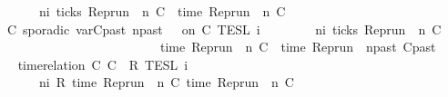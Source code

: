 \begin{isabellebody}
\ \ \ \ \ \ {\isacharbraceleft}{\isasymrho}{\isachardot}\ {\isasymexists}n{\isasymge}i{\isachardot}\ ticks\ {\isacharparenleft}{\isacharparenleft}Rep{\isacharunderscore}run\ {\isasymrho}{\isacharparenright}\ n\ C\ {\isasymand}\ time\ {\isacharparenleft}{\isacharparenleft}Rep{\isacharunderscore}run\ {\isasymrho}{\isacharparenright}\ n\ C\ {\isacharequal}\ {\isasymtau}{\isacharbraceright}{\isacartoucheclose}\isanewline
{\isacharbar}\ {\isacartoucheopen}{\isasymlbrakk}\ C\ sporadic{\isasymsharp}\ {\isasymlparr}{\isasymtau}\isactrlsub v\isactrlsub a\isactrlsub r{\isacharparenleft}C\isactrlsub p\isactrlsub a\isactrlsub s\isactrlsub t{\isacharcomma}\ n\isactrlsub p\isactrlsub a\isactrlsub s\isactrlsub t{\isacharparenright}\ {\isasymoplus}\ {\isasymdelta}{\isasymtau}{\isasymrparr}\ on\ C\ {\isasymrbrakk}\isactrlsub T\isactrlsub E\isactrlsub S\isactrlsub L\isactrlbsup {\isasymge}\ i\isactrlesup \ {\isacharequal}\isanewline
\ \ \ \ \ \ {\isacharbraceleft}{\isasymrho}{\isachardot}\ {\isasymexists}n{\isasymge}i{\isachardot}\ ticks\ {\isacharparenleft}{\isacharparenleft}Rep{\isacharunderscore}run\ {\isasymrho}{\isacharparenright}\ n\ C\isanewline
\ \ \ \ \ \ \ \ \ \ \ \ \ \ \ \ \ \ \ \ \ \ \ \ \ {\isasymand}\ time\ {\isacharparenleft}{\isacharparenleft}Rep{\isacharunderscore}run\ {\isasymrho}{\isacharparenright}\ n\ C\ {\isacharequal}\ time\ {\isacharparenleft}{\isacharparenleft}Rep{\isacharunderscore}run\ {\isasymrho}{\isacharparenright}\ n\isactrlsub p\isactrlsub a\isactrlsub s\isactrlsub t\ C\isactrlsub p\isactrlsub a\isactrlsub s\isactrlsub t{\isacharparenright}\ {\isacharplus}\ {\isasymdelta}{\isasymtau}\ {\isacharbraceright}{\isacartoucheclose}\isanewline
{\isacharbar}\ {\isacartoucheopen}{\isasymlbrakk}\ time{\isacharminus}relation\ {\isasymlfloor}C\ C\ {\isasymin}\ R\ {\isasymrbrakk}\isactrlsub T\isactrlsub E\isactrlsub S\isactrlsub L\isactrlbsup {\isasymge}\ i\isactrlesup \ {\isacharequal}\isanewline
\ \ \ \ \ \ {\isacharbraceleft}{\isasymrho}{\isachardot}\ {\isasymforall}n{\isasymge}i{\isachardot}\ R\ {\isacharparenleft}time\ {\isacharparenleft}{\isacharparenleft}Rep{\isacharunderscore}run\ {\isasymrho}{\isacharparenright}\ n\ C\ time\ {\isacharparenleft}{\isacharparenleft}Rep{\isacharunderscore}run\ {\isasymrho}{\isacharparenright}\ n\ C\isanewline

\end{isabellebody}
